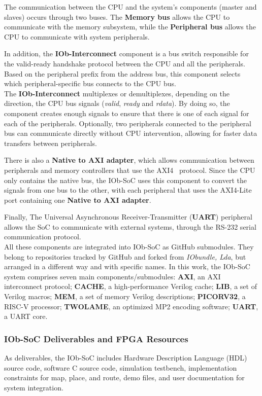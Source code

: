 The communication between the CPU and the system’s components (master and slaves) occurs through two buses. The \textbf{Memory bus} allows the CPU to communicate with the memory subsystem, while the \textbf{Peripheral bus} allows the CPU to communicate with system peripherals.

In addition, the \textbf{IOb-Interconnect} component is a bus switch responsible for the valid-ready handshake protocol between the CPU and all the peripherals. Based on the peripheral prefix from the address bus, this component selects which peripheral-specific bus connects to the CPU bus. \\
The \textbf{IOb-Interconnect} multiplexes or demultiplexes, depending on the direction, the CPU bus signals (\textit{valid}, \textit{ready} and \textit{rdata}). By doing so, the component creates enough signals to ensure that there is one of each signal for each of the peripherals. Optionally, two peripherals connected to the peripheral bus can communicate directly without CPU intervention, allowing for faster data transfers between peripherals.

There is also a \textbf{Native to AXI adapter}, which allows communication between peripherals and memory controllers that use the AXI4~\cite{bib:axi_amba} protocol. Since the CPU only contains the native bus, the IOb-SoC uses this component to convert the signals from one bus to the other, with each peripheral that uses the AXI4-Lite port containing one \textbf{Native to AXI adapter}.

Finally, The Universal Asynchronous Receiver-Transmitter (\textbf{\textbf{UART}}) peripheral allows the SoC to communicate with external systems, through the RS-232 serial communication protocol. \\

All these components are integrated into IOb-SoC as GitHub submodules. They belong to repositories tracked by GitHub and forked from \textit{IObundle, Lda}, but arranged in a different way and with specific names.
In this work, the IOb-SoC system comprises seven main components/submodules: \textbf{AXI}, an AXI interconnect protocol;
\textbf{CACHE}, a high-performance Verilog cache; \textbf{LIB}, a set of Verilog macros; \textbf{MEM}, a set of memory Verilog descriptions; \textbf{PICORV32}, a RISC-V processor; \textbf{TWOLAME}, an optimized MP2 encoding software; \textbf{UART}, a UART core. 

\subsubsection{IOb-SoC Deliverables and FPGA Resources}
As deliverables, the IOb-SoC includes Hardware Description Language (HDL) source code, software C source code, simulation testbench, implementation constraints for map, place, and route, demo files, and user documentation for system integration.

